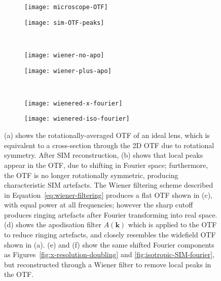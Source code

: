 \begin{figure}[tbp]
\vspace{-6pt} \centering
\begin{subfigure}[b]{0.49\textwidth}
	\texttt{[image: microscope-OTF]}\vspace*{-16pt}
	\caption{}\label{fig:microscope-OTF}
\end{subfigure}
\hfill
\begin{subfigure}[b]{0.49\textwidth}
	\texttt{[image: sim-OTF-peaks]}\vspace*{-16pt}
	\caption{}\label{fig:OTF-sim-peaks}
\end{subfigure} \vspace{-22pt}

~\newline
\begin{subfigure}[b]{0.49\textwidth}
	\texttt{[image: wiener-no-apo]}\vspace*{-16pt}
	\caption{}\label{fig:wiener-no-apo}
\end{subfigure}
\hfill
\begin{subfigure}[b]{0.49\textwidth}
	\texttt{[image: wiener-plus-apo]}\vspace*{-16pt}
	\caption{}\label{fig:wiener-plus-apo}
\end{subfigure}

~\newline
\begin{subfigure}[b]{0.49\textwidth}
	\texttt{[image: wienered-x-fourier]}
	\caption{}\label{fig:wienered-x-fourier}
\end{subfigure}
\hfill
\begin{subfigure}[b]{0.49\textwidth}
	\texttt{[image: wienered-iso-fourier]}
	\caption{}\label{fig:wienered-iso-fourier}
\end{subfigure}
\caption[LAG SIM: Wiener filtering of the SIM OTF is required for artefact-free reconstruction]{(a) shows the rotationally-averaged OTF of an ideal lens, which is equivalent to a cross-section through the 2D OTF due to rotational symmetry. After SIM reconstruction, (b) shows that local peaks appear in the OTF, due to shifting in Fourier space; furthermore, the OTF is no longer rotationally symmetric, producing characteristic SIM artefacts. The Wiener filtering scheme described in Equation~\ref{eq:wiener-filtering} produces a flat OTF shown in (c), with equal power at all frequencies; however the sharp cutoff produces ringing artefacts after Fourier transforming into real space. (d) shows the apodisation filter $A\left(\textbf{k}\right)$ which is applied to the OTF to reduce ringing artefacts, and closely resembles the widefield OTF shown in (a). (e) and (f) show the same shifted Fourier components as Figures~\ref{fig:x-resolution-doubling} and \ref{fig:isotropic-SIM-fourier}, but reconstructed through a Wiener filter to remove local peaks in the OTF.}
\label{fig:sim-OTFs}
\end{figure}

